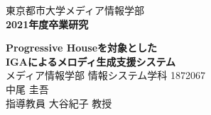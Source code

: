 \documentclass[fleqn,11pt,dvipdfmx]{jreport}
\begin{document}
\baselineskip 21.5pt

\begin{titlepage}
	\vspace*{3cm}
	\begin{center}
		{\Large\gt 東京都市大学メディア情報学部}\\
		\vspace*{0.5cm}
		{\Large\bf 2021年度卒業研究}\\
		\vspace{1.5cm}

		{\huge\bf Progressive Houseを対象とした}\\
		\vspace{0.5cm}
		{\huge\bf IGAによるメロディ生成支援システム}\\

		\vspace{9cm}
		{\Large メディア情報学部 情報システム学科 1872067}\\
		{\Large 中尾 圭吾}\\
		\vspace*{0.5cm}
		{\Large 指導教員 大谷紀子 教授}\\
	\end{center}
\end{titlepage}

\tableofcontents
\cleardoublepage












%


\appendix


\end{document}
